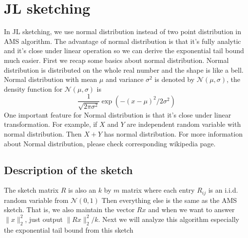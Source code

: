 \documentclass[11pt]{article}
\begin{document}
\section{JL sketching}
In JL sketching, we use normal distribution instead of two point distribution in AMS algorithm. The advantage of normal distribution is that it's fully analytic and it's close under linear operation so we can derive the exponential tail bound much easier. First we recap some basics about normal distribution. Normal distribution is distributed on the whole real number and the shape is like a bell. Normal distribution with mean $\mu$ and variance $\sigma^2$ is denoted by $\mathcal{N}(\mu, \sigma)$, the density function for $\mathcal{N}(\mu, \sigma)$ is
$$ \frac{1}{\sqrt{2\pi\sigma^2}}\exp(-(x-\mu)^2/2\sigma^2) $$
One important feature for Normal distribution is that it's close under linear transformation. For example, if $X$ and $Y$ are independent random variable with normal distribution. Then $X + Y$ has normal distribution. For more information about Normal distribution, please check corresponding wikipedia page. 

\subsection{Description of the sketch}
The sketch matrix $R$ is also an $k$ by $m$ matrix where each entry $R_{ij}$ is an i.i.d. random variable from $\mathcal{N}(0, 1)$ Then everything else is the same as the AMS sketch. That is, we also maintain the vector $Rx$ and when we want to answer $\|x\|_2^2$, just output $\|Rx\|_2^2/k$. Next we will analyze this algorithm especially the exponential tail bound from this sketch
\end{document}
